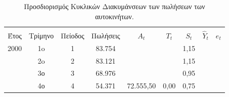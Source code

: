 \begin{table} [h]
  \caption{Προσδιορισμός Κυκλικών Διακυμάνσεων των πωλήσεων των αυτοκινήτων.} 
  \label{tab_4}
  \begin{center}
    \begin{tabular}{|c|c|c|c|c|c|c|c|c|}
      \hline
           &   &   &   &
           &   &  &   &     \\
           Έτος & Τρίμηνο  & Πείοδος  & Πωλήσεις  & $ A_t$
           & $T_t$   & $ S_t$  & $ \widehat{Y}_t$  & $ e_t$ \\
      \hline \hline
      2000 &  1o  &  1  &  83.754  &    &     & 1,15 &  & \\
           &  2o  &  2  &  83.121  &    &   & 1,15  &  & \\
           & 3ο & 3  &  68.976 &   &  & 0,95 &  &  \\
           & 4ο & 4 & 54.371 & 72.555,50 & 0,00  & 0,75 &  &  \\
           

\end{tabular}
\end{center}
\end{table}
